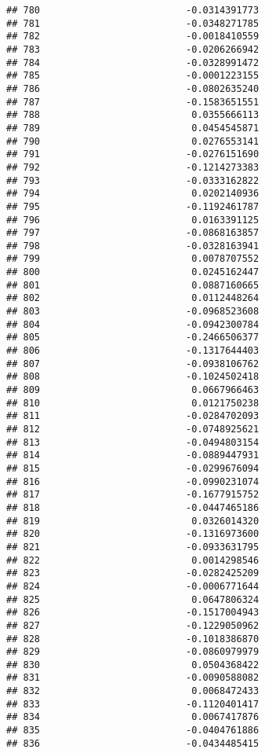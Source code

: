 \documentclass[
]{article}
\begin{document}
\begin{verbatim}
## 780                          -0.0314391773
## 781                          -0.0348271785
## 782                          -0.0018410559
## 783                          -0.0206266942
## 784                          -0.0328991472
## 785                          -0.0001223155
## 786                          -0.0802635240
## 787                          -0.1583651551
## 788                           0.0355666113
## 789                           0.0454545871
## 790                           0.0276553141
## 791                          -0.0276151690
## 792                          -0.1214273383
## 793                          -0.0333162822
## 794                           0.0202140936
## 795                          -0.1192461787
## 796                           0.0163391125
## 797                          -0.0868163857
## 798                          -0.0328163941
## 799                           0.0078707552
## 800                           0.0245162447
## 801                           0.0887160665
## 802                           0.0112448264
## 803                          -0.0968523608
## 804                          -0.0942300784
## 805                          -0.2466506377
## 806                          -0.1317644403
## 807                          -0.0938106762
## 808                          -0.1024502418
## 809                           0.0667966463
## 810                           0.0121750238
## 811                          -0.0284702093
## 812                          -0.0748925621
## 813                          -0.0494803154
## 814                          -0.0889447931
## 815                          -0.0299676094
## 816                          -0.0990231074
## 817                          -0.1677915752
## 818                          -0.0447465186
## 819                           0.0326014320
## 820                          -0.1316973600
## 821                          -0.0933631795
## 822                           0.0014298546
## 823                          -0.0282425209
## 824                          -0.0006771644
## 825                           0.0647806324
## 826                          -0.1517004943
## 827                          -0.1229050962
## 828                          -0.1018386870
## 829                          -0.0860979979
## 830                           0.0504368422
## 831                          -0.0090588082
## 832                           0.0068472433
## 833                          -0.1120401417
## 834                           0.0067417876
## 835                          -0.0404761886
## 836                          -0.0434485415

\end{verbatim}
\end{document}
